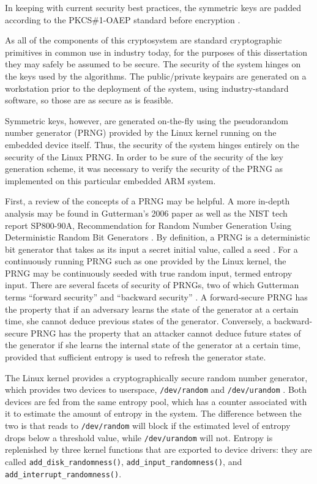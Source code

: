 In keeping with current security best practices, the symmetric keys are padded according to the PKCS\#1-OAEP standard before encryption \cite{Bellare1995}.


As all of the components of this cryptosystem are standard cryptographic primitives in common use in industry today, for the purposes of this
dissertation they may safely be assumed to be secure. The security of the system hinges on the keys used by the algorithms. The public/private
keypairs are generated on a workstation prior to the deployment of the system, using industry-standard software, so those are as secure
as is feasible.

Symmetric keys, however, are generated on-the-fly using the pseudorandom number generator (PRNG) provided by the Linux kernel running
on the embedded device itself. Thus, the security of the system hinges entirely on the security of the Linux PRNG. In order to be sure of
the security of the key generation scheme, it was necessary to verify the security of the PRNG as implemented on this particular embedded ARM
system.

First, a review of the concepts of a PRNG may be helpful. A more in-depth analysis may be found in Gutterman's 2006 paper \cite{Gutterman2006}
as well as the NIST tech report SP800-90A, Recommendation for Random Number Generation Using Deterministic Random Bit Generators \cite{NISTSP80090A}.
By definition, a PRNG is a deterministic bit generator that takes as its input a secret initial value, called a seed \cite{NISTSP80090A}.
For a continuously running PRNG such as one provided by the Linux kernel, the PRNG may be continuously seeded with true random input, termed entropy input.
There are several facets of security of PRNGs, two of which Gutterman terms ``forward security'' and ``backward security'' \cite{Gutterman2006}.
A forward-secure PRNG has the property that if an adversary learns the state of the generator at a certain time, she cannot deduce previous
states of the generator. Conversely, a backward-secure PRNG has the property that an attacker cannot deduce future states of the generator
if she learns the internal state of the generator at a certain time, provided that sufficient entropy is used to refresh the generator state.

The Linux kernel provides a cryptographically secure random number generator, which provides two devices to userspace, \texttt{/dev/random} and
\texttt{/dev/urandom} \cite{goichon2012}.  Both devices are fed from the same entropy pool, which has a counter associated with it to estimate the amount of
entropy in the system. The difference between the two is that reads to \texttt{/dev/random} will block if the estimated level of entropy drops below
a threshold value, while \texttt{/dev/urandom} will not. Entropy is replenished by three kernel functions that are exported to device drivers: they are called
\texttt{add\_disk\_randomness()}, \texttt{add\_input\_randomness()}, and \texttt{add\_interrupt\_randomness()}.

